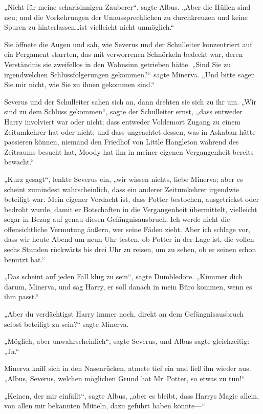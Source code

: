 {„Nicht für meine scharfsinnigen Zauberer“, sagte Albus. „Aber die Hüllen sind neu; und die Vorkehrungen der Unaussprechlichen zu durchkreuzen und keine Spuren zu hinterlassen…ist vielleicht nicht unmöglich.“

Sie öffnete die Augen und sah, wie Severus und der Schulleiter konzentriert auf ein Pergament starrten, das mit verworrenen Schnörkeln bedeckt war, deren Verständnis sie zweifellos in den Wahnsinn getrieben hätte. „Sind Sie zu irgendwelchen Schlussfolgerungen gekommen?“ sagte Minerva. „Und bitte sagen Sie mir nicht, wie Sie zu ihnen gekommen sind.“

Severus und der Schulleiter sahen sich an, dann drehten sie sich zu ihr um. „Wir sind zu dem Schluss gekommen“, sagte der Schulleiter ernst, „dass entweder Harry involviert war oder nicht; dass entweder Voldemort Zugang zu einem Zeitumkehrer hat oder nicht; und dass ungeachtet dessen, was in Askaban hätte passieren können, niemand den Friedhof von Little Hangleton während des Zeitraums besucht hat, Moody hat ihn in meiner eigenen Vergangenheit bereits bewacht.“

„Kurz gesagt“, lenkte Severus ein, „wir wissen nichts, liebe Minerva; aber es scheint zumindest wahrscheinlich, dass ein anderer Zeitumkehrer irgendwie beteiligt war. Mein eigener Verdacht ist, dass Potter bestochen, ausgetrickst oder bedroht wurde, damit er Botschaften in die Vergangenheit übermittelt, vielleicht sogar in Bezug auf genau diesen Gefängnisausbruch. Ich werde nicht die offensichtliche Vermutung äußern, wer seine Fäden zieht. Aber ich schlage vor, dass wir heute Abend um neun Uhr testen, ob Potter in der Lage ist, die vollen sechs Stunden rückwärts bis drei Uhr zu reisen, um zu sehen, ob er seinen schon benutzt hat.“

„Das scheint auf jeden Fall klug zu sein“, sagte Dumbledore. „Kümmer dich darum, Minerva, und sag Harry, er soll danach in mein Büro kommen, wenn es ihm passt.“

„Aber du verdächtigst Harry immer noch, direkt an dem Gefängnisausbruch selbst beteiligt zu sein?“ sagte Minerva.

„Möglich, aber unwahrscheinlich“, sagte Severus, und Albus sagte gleichzeitig: „Ja.“

Minerva kniff sich in den Nasenrücken, atmete tief ein und ließ ihn wieder aus. „Albus, Severus, welchen möglichen Grund hat Mr~Potter, so etwas zu tun!“

„Keinen, der mir einfällt“, sagte Albus, „aber es bleibt, dass Harrys Magie allein, von allen mir bekannten Mitteln, dazu geführt haben könnte—“

}
